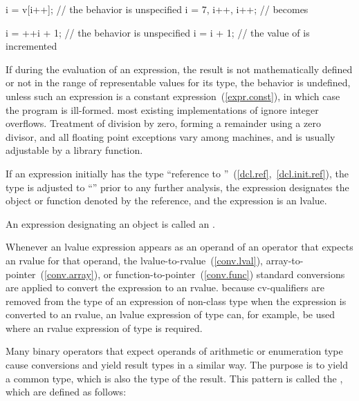 \begin{codeblock}
i = v[i++];			// the behavior is unspecified
i = 7, i++, i++;		//  becomes 

i = ++i + 1;			// the behavior is unspecified
i = i + 1;			// the value of  is incremented
\end{codeblock}

\exitexampleb

\pnum
{}%
%
%
%
%
If during the evaluation of an expression, the result is not
mathematically defined or not in the range of representable values for
its type, the behavior is undefined, unless such an expression is a
constant expression~(\ref{expr.const}), in which case the program is
ill-formed.
\enternote 
{}%
most existing implementations of \Cpp ignore integer overflows.
Treatment of division by zero, forming a remainder using a zero divisor,
and all floating point exceptions vary among machines, and is usually
adjustable by a library function.
\exitnote 

\pnum
{}%
If an expression initially has the type ``reference to
''~(\ref{dcl.ref},~\ref{dcl.init.ref}), the type is adjusted to
``'' prior to any further analysis, the expression designates the
object or function denoted by the reference, and the expression
is an lvalue.

\pnum
An expression designating an object is called an .

\pnum
Whenever an lvalue expression appears as an operand of an operator that
expects an rvalue for that operand, the
lvalue-to-rvalue~(\ref{conv.lval}), array-to-pointer~(\ref{conv.array}),
or function-to-pointer~(\ref{conv.func}) standard conversions are
applied to convert the expression to an rvalue.
\enternote 
because cv-qualifiers are removed from the type of an expression of
non-class type when the expression is converted to an rvalue, an lvalue
expression of type  can, for example, be used where
an rvalue expression of type  is required.
\exitnote 

\pnum
{}%
Many binary operators that expect operands of arithmetic or enumeration
type cause conversions and yield result types in a similar way. The
purpose is to yield a common type, which is also the type of the result.
This pattern is called the ,
which are defined as follows:

